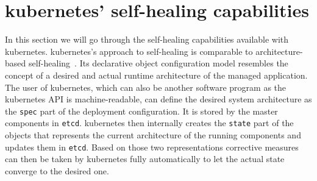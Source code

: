 
\section{\Gls{kubernetes}' self-healing capabilities}
  In this section we will go through the self-healing capabilities available with \gls{kubernetes}.
  \gls{kubernetes}'s approach to self-healing is comparable to architecture-based self-healing~\cite{ToffettiMicroservices,DashofyArchitecture}.
  Its declarative object configuration model resembles the concept of a desired and actual runtime architecture of the managed application.
  The user of \gls{kubernetes}, which can also be another software program as the \gls{kubernetes} API is machine-readable, can define the desired system architecture as the \texttt{spec} part of the deployment configuration.
  It is stored by the master components in \texttt{etcd}.
  \Gls{kubernetes} then internally creates the \texttt{state} part of the objects that represents the current architecture of the running components and updates them in \texttt{etcd}.
  Based on those two representations corrective measures can then be taken by \gls{kubernetes} fully automatically to let the actual state converge to the desired one.


